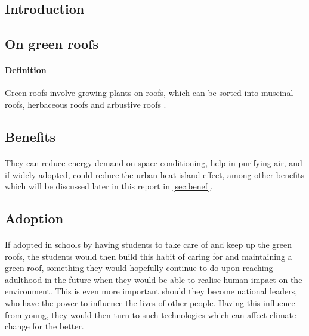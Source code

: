 \documentclass{article}
\begin{document}
\newpage

\tableofcontents
\newpage

\begin{multicols}{2}

  \section{Introduction}
  \subsection{On green roofs}
  \paragraph{Definition} Green roofs involve growing plants on roofs,
  which can be sorted into muscinal roofs, herbaceous roofs and arbustive
  roofs \cite{ecoeng}.


  \subsection{Benefits}
  \paragraph{} They can reduce energy demand on space conditioning,
  help in purifying air, and if widely adopted, could reduce the urban
  heat island effect, among other benefits \cite{energeff} which will
  be discussed later in this report in \autoref{sec:benef}.


  \subsection{Adoption}
  \paragraph{} If adopted in schools by having students to take care
  of and keep up the green roofs, the students would then build this
  habit of caring for and maintaining a green roof, something they would
  hopefully continue to do upon reaching adulthood in the future when
  they would be able to realise human impact on the environment. This is
  even more important should they become national leaders, who have the
  power to influence the lives of other people. Having this influence
  from young, they would then turn to such technologies which can affect
  climate change for the better.


\end{multicols}
\end{document}
